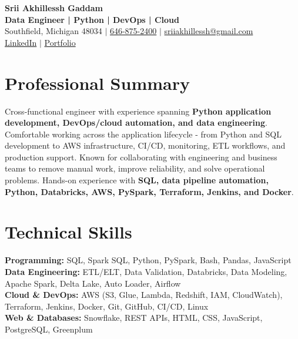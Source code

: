 \documentclass[letterpaper,10pt]{article}
\begin{document}
\fontsize{9.35pt}{10.45pt}\selectfont

\begin{center}
    {\LARGE \textbf{Srii Akhillessh Gaddam}} \\[-1pt]
    \textbf{Data Engineer | Python | DevOps | Cloud} \\[2pt]
    Southfield, Michigan 48034 $|$
    \href{tel:6468752400}{646-875-2400} $|$
    \href{mailto:sriiakhillessh@gmail.com}{sriiakhillessh@gmail.com} \\[1pt]
    \href{https://www.linkedin.com/in/srii-akhiilessh-gaddam-b48668191/}{LinkedIn} $|$
    \href{https://sriiakhillesshg.github.io/portfolio/}{Portfolio}
\end{center}
\vspace{-8pt}

\section{Professional Summary}
\small{Cross-functional engineer with experience spanning \textbf{Python application development, DevOps/cloud automation, and data engineering}. Comfortable working across the application lifecycle - from Python and SQL development to AWS infrastructure, CI/CD, monitoring, ETL workflows, and production support. Known for collaborating with engineering and business teams to remove manual work, improve reliability, and solve operational problems. Hands-on experience with \textbf{SQL, data pipeline automation, Python, Databricks, AWS, PySpark, Terraform, Jenkins, and Docker}.}

\section{Technical Skills}
\small{
\textbf{Programming:} SQL, Spark SQL, Python, PySpark, Bash, Pandas, JavaScript \\
\textbf{Data Engineering:} ETL/ELT, Data Validation, Databricks, Data Modeling, Apache Spark, Delta Lake, Auto Loader, Airflow \\
\textbf{Cloud \& DevOps:} AWS (S3, Glue, Lambda, Redshift, IAM, CloudWatch), Terraform, Jenkins, Docker, Git, GitHub, CI/CD, Linux \\
\textbf{Web \& Databases:} Snowflake, REST APIs, HTML, CSS, JavaScript, PostgreSQL, Greenplum
}

\end{document}
